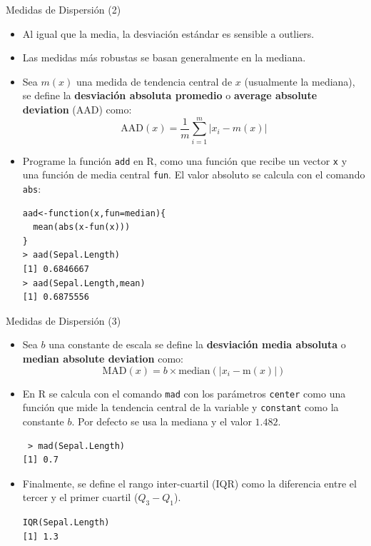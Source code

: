 \documentclass[handout]{beamer}
\begin{document}
\begin{frame}[fragile]{Medidas de Dispersión (2)}
\scriptsize{ 
\begin{itemize}
 \item Al igual que la media, la desviación estándar es sensible a outliers.
 \item Las medidas más robustas se basan generalmente en la mediana.

  \item Sea $m(x)$ una medida de tendencia central de $x$ (usualmente la mediana), se define la \textbf{desviación absoluta promedio} o \textbf{average absolute deviation} (AAD)  como:
  \begin{displaymath}
   \text{AAD}(x) = \frac{1}{m}\sum_{i=1}^{m}|x_i-m(x)| 
  \end{displaymath}
  
  \item Programe la función \verb+add+ en R, como una función que recibe un vector \verb+x+ y una función de media central \verb+fun+. El valor absoluto se calcula con el comando \verb+abs+:
  \pause
  
  \begin{verbatim}
aad<-function(x,fun=median){
  mean(abs(x-fun(x)))
}
> aad(Sepal.Length)
[1] 0.6846667
> aad(Sepal.Length,mean)
[1] 0.6875556
  \end{verbatim}


\end{itemize}
 
 
 
} 
\end{frame}


\begin{frame}[fragile]{Medidas de Dispersión (3)}
\scriptsize{ 
\begin{itemize}
 \item Sea $b$ una constante de escala se define la \textbf{desviación media absoluta} o \textbf{median absolute deviation} como: 
 \begin{displaymath}
  \text{MAD}(x) = b \times \text{median}(|x_{i}-\text{m}(x)|)
 \end{displaymath}
 \item En R se calcula con el comando \verb+mad+ con los parámetros  \verb+center+ como una función que mide la tendencia central de la variable y \verb+constant+ como la constante $b$. Por defecto se usa la mediana y el valor $1.482$. 
 \begin{verbatim}
 > mad(Sepal.Length)
[1] 0.7 
 \end{verbatim}

 \item Finalmente, se define el rango inter-cuartil (IQR) como la diferencia entre el tercer y el primer cuartil ($Q_3 - Q_1$).
 \begin{verbatim}
IQR(Sepal.Length)
[1] 1.3  
 \end{verbatim}

\end{itemize}
  
} 
\end{frame}
\end{document}

